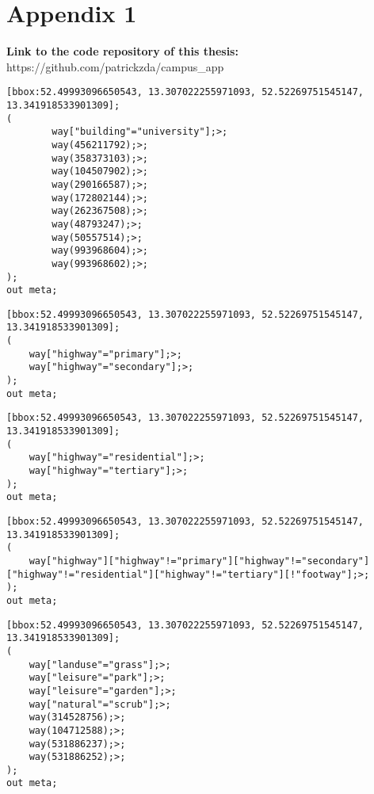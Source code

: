 \chapter{Appendix 1}
\label{appendix:listing1}

\textbf{Link to the code repository of this thesis: } https://github.com/patrickzda/campus\_app

\lstset{language=SQL}
\begin{lstlisting}[caption={Overpass Turbo query for all of TU Berlin's buildings}, label={buildings}]
[bbox:52.49993096650543, 13.307022255971093, 52.52269751545147, 13.341918533901309];
(
        way["building"="university"];>;
        way(456211792);>;
        way(358373103);>;
        way(104507902);>;
        way(290166587);>;
        way(172802144);>;
        way(262367508);>;
        way(48793247);>;
        way(50557514);>;
        way(993968604);>;
        way(993968602);>;
);
out meta;
\end{lstlisting}

\begin{lstlisting}[caption={Overpass Turbo query for all main roads next to the campus}, label={main_roads}]
[bbox:52.49993096650543, 13.307022255971093, 52.52269751545147, 13.341918533901309];
(
    way["highway"="primary"];>;
    way["highway"="secondary"];>;
);
out meta;
\end{lstlisting}

\begin{lstlisting}[caption={Overpass Turbo query for all small roads next to the campus}, label={small_roads}]
[bbox:52.49993096650543, 13.307022255971093, 52.52269751545147, 13.341918533901309];
(
    way["highway"="residential"];>;
    way["highway"="tertiary"];>;
);
out meta;
\end{lstlisting}

\begin{lstlisting}[caption={Overpass Turbo query for all pathways and sidewalks next to the campus}, label={pathways}]
[bbox:52.49993096650543, 13.307022255971093, 52.52269751545147, 13.341918533901309];
(
    way["highway"]["highway"!="primary"]["highway"!="secondary"]["highway"!="residential"]["highway"!="tertiary"][!"footway"];>;
);
out meta;
\end{lstlisting}

\begin{lstlisting}[caption={Overpass Turbo query for all water green next to the campus}, label={green_areas}]
[bbox:52.49993096650543, 13.307022255971093, 52.52269751545147, 13.341918533901309];
(
    way["landuse"="grass"];>; 
    way["leisure"="park"];>;
    way["leisure"="garden"];>; 
    way["natural"="scrub"];>; 
    way(314528756);>; 
    way(104712588);>;
    way(531886237);>;
    way(531886252);>;
);
out meta;
\end{lstlisting}

